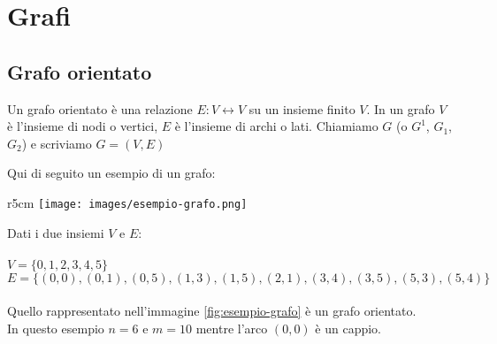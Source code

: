 \newpage
\section{Grafi}
\subsection{Grafo orientato}
\begin{definition}
Un grafo orientato è una relazione $E: V \leftrightarrow V$ su un insieme finito $V$. In un grafo $V$ è l'insieme di nodi o vertici, $E$ è l'insieme di archi o lati. Chiamiamo $G$ (o $G^1$, $G_1$, $G_2$) e scriviamo $G = (V,E)$
\end{definition}


\begin{example}\label{esempio-grafo-1}
    Qui di seguito un esempio di un grafo:
\end{example}
\begin{wrapfigure}[4]{r}{5cm}
    \vspace{-35pt}
    \centering
    \texttt{[image: images/esempio-grafo.png]}
    \vspace{-5pt}
    \caption{Grafo G}
    \label{fig:esempio-grafo}
\end{wrapfigure}

\hspace{-15pt}Dati i due insiemi $V$ e $E$:\\\\
$V = \{0,1,2,3,4,5\}$ \\
$E = \{(0,0), (0,1), (0,5), (1,3), (1,5), (2,1), (3,4), (3,5), (5,3), (5,4)\}$\\ \\
Quello rappresentato nell'immagine \ref{fig:esempio-grafo} è un grafo orientato.\\
In questo esempio $n = 6$ e $m = 10$ mentre l'arco $(0,0)$ è un cappio.

